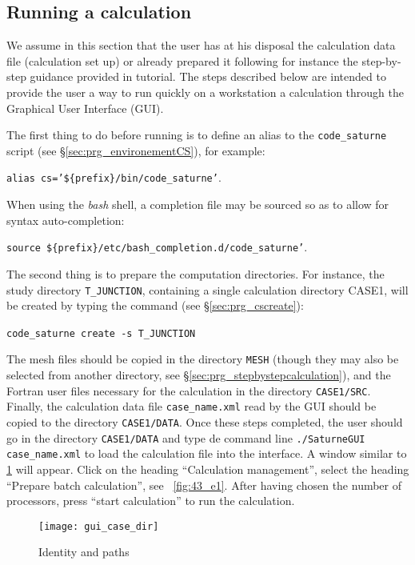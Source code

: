 \subsection{Running a calculation}
We assume in this section that the user has at his disposal the calculation data file (calculation set up) or already prepared it following for instance the step-by-step guidance provided in \CS tutorial. The steps described below are intended to provide the user a way to run quickly on a workstation a calculation through the Graphical User Interface (GUI).

The first thing to do before running \CS is to define an alias to the \texttt{code\_saturne} script
(see \S\ref{sec:prg_environementCS}), for example:
\begin{center}
\texttt{alias cs='\$\{prefix\}/bin/code\_saturne'}.
\end{center}
When using the \emph{bash} shell, a completion file may be sourced so as to
allow for syntax auto-completion:
\begin{center}
\texttt{source \$\{prefix\}/etc/bash\_completion.d/code\_saturne'}.
\end{center}
The second thing is to prepare the computation directories. For instance, the study directory \texttt{T\_JUNCTION}, containing a single calculation directory CASE1, will be created by typing the command (see \S\ref{sec:prg_cscreate}):\
\begin{center}
\texttt{code\_saturne create -s T\_JUNCTION}\
\end{center}
The mesh files should be copied in the directory \texttt{MESH} (though they may also be selected from another directory, see \S\ref{sec:prg_stepbystepcalculation}),
and the Fortran user files necessary for the calculation in the directory \texttt{CASE1/SRC}.  Finally, the calculation data file \texttt{case\_name.xml} read by the GUI should be copied to the directory \texttt{CASE1/DATA}.
Once these steps completed, the user should go in the directory \texttt{CASE1/DATA} and type de command line \texttt{./SaturneGUI case\_name.xml} to load the calculation file into the interface. A window similar to \figurename\ref{fig:3_e1} will appear. Click on the heading ``Calculation management'', select the heading ``Prepare batch calculation'', see \figurename~\ref{fig:43_e1}. After having chosen the number of processors, press ``start calculation'' to run the calculation.

\begin{figure}[!ht]
\begin{center}
\texttt{[image: gui\_case\_dir]}
\caption{Identity and paths}
\label{fig:3_e1}
\end{center}
\end{figure}

